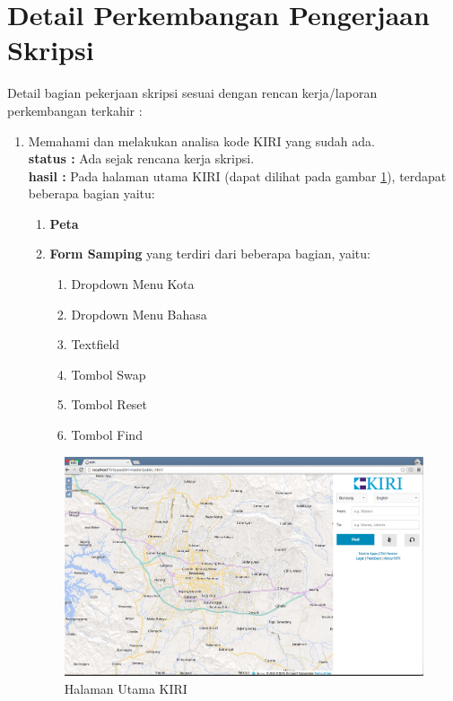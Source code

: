 \documentclass[a4paper,twoside]{article}
\begin{document}
\section{Detail Perkembangan Pengerjaan Skripsi}
Detail bagian pekerjaan skripsi sesuai dengan rencan kerja/laporan perkembangan terkahir :
  \begin{enumerate}
    \item Memahami dan melakukan analisa kode KIRI yang sudah ada.\\
    {\bf status :} Ada sejak rencana kerja skripsi.\\
    {\bf hasil :} 
    Pada halaman utama KIRI (dapat dilihat pada gambar \ref{fig:3_KIRI_main}), terdapat beberapa bagian yaitu:
    \begin{enumerate}
    		\item \textbf{Peta}
    		\item \textbf{Form Samping} yang terdiri dari beberapa bagian, yaitu:
    		\begin{enumerate}
    			\item Dropdown Menu Kota
    			\item Dropdown Menu Bahasa
    			\item Textfield
    			\item Tombol Swap
    			\item Tombol Reset
    			\item Tombol Find
    		\end{enumerate}
    \end{enumerate}

\begin{figure}[H]
  \centering
  \includegraphics[scale=0.3]{Gambar/KIRI-main}
  \caption{Halaman Utama KIRI} 
  \label{fig:3_KIRI_main}
\end{figure}


\end{enumerate}
\end{document}
